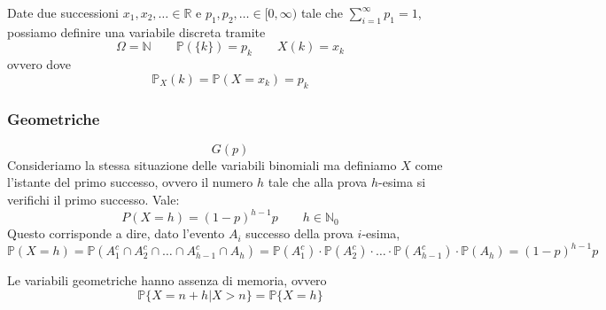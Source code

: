 \begin{observation}
	Date due successioni $x_1,x_2, \ldots \in \mathbb{R}$ e $p_1, p_2, \ldots \in [0, \infty)$ tale che $\sum_{i=1}^{\infty}p_1 = 1$, possiamo definire una variabile discreta tramite
	\begin{equation}
		\Omega = \mathbb{N} \quad\quad \mathbb{P}(\{k\})=p_k \quad\quad X(k) = x_k
	\end{equation}
	ovvero dove
	\begin{equation*}
		\mathbb{P}_X(k) = \mathbb{P}(X = x_k) = p_k
	\end{equation*}
\end{observation}

\subsubsection{Geometriche}
\begin{equation}
	G(p)
\end{equation}
Consideriamo la stessa situazione delle variabili binomiali ma definiamo $X$ come l'istante del primo successo, ovvero il numero $h$ tale che alla prova $h$-esima si verifichi il primo successo. Vale:
\begin{equation}
	P(X=h)=(1-p)^{h-1}p \quad\quad h \in \mathbb{N}_0
\end{equation}
Questo corrisponde a dire, dato l'evento $A_i$ successo della prova $i$-esima,
\begin{equation*}
	\mathbb{P}(X=h) = \mathbb{P}(A^c_1 \cap A^c_2 \cap \ldots \cap A^c_{h-1} \cap A_h) = \mathbb{P}(A^c_1) \cdot \mathbb{P}(A^c_2) \cdot \ldots \cdot \mathbb{P}(A^c_{h-1}) \cdot \mathbb{P}(A_h) = (1-p)^{h-1}p
\end{equation*} 

\begin{observation}
	Le variabili geometriche hanno assenza di memoria, ovvero
	\begin{equation}
		\mathbb{P}\{X=n+h \vert X >n \} = \mathbb{P}\{X=h\}
	\end{equation}
\end{observation}

